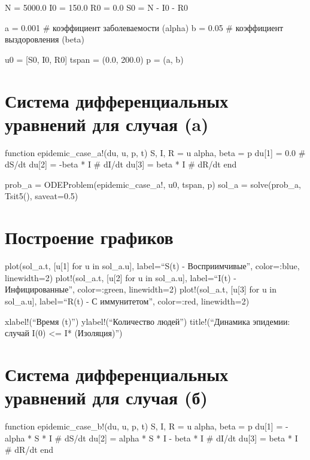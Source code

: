 \documentclass[
  english,
  russian,
  12pt,
  a4paper,
  DIV=11,
  numbers=noendperiod]{scrreprt}
\begin{document}
N = 5000.0 I0 = 150.0 R0 = 0.0 S0 = N - I0 - R0

a = 0.001 \# коэффициент заболеваемости (alpha) b = 0.05 \# коэффициент
выздоровления (beta)

u0 = {[}S0, I0, R0{]} tspan = (0.0, 200.0) p = (a, b)

\chapter{Система дифференциальных уравнений для случая
(a)}\label{ux441ux438ux441ux442ux435ux43cux430-ux434ux438ux444ux444ux435ux440ux435ux43dux446ux438ux430ux43bux44cux43dux44bux445-ux443ux440ux430ux432ux43dux435ux43dux438ux439-ux434ux43bux44f-ux441ux43bux443ux447ux430ux44f-a}

function epidemic\_case\_a!(du, u, p, t) S, I, R = u alpha, beta = p
du{[}1{]} = 0.0 \# dS/dt du{[}2{]} = -beta * I \# dI/dt du{[}3{]} = beta
* I \# dR/dt end

prob\_a = ODEProblem(epidemic\_case\_a!, u0, tspan, p) sol\_a =
solve(prob\_a, Tsit5(), saveat=0.5)

\chapter{Построение
графиков}\label{ux43fux43eux441ux442ux440ux43eux435ux43dux438ux435-ux433ux440ux430ux444ux438ux43aux43eux432}

plot(sol\_a.t, {[}u{[}1{]} for u in sol\_a.u{]}, label=\enquote{S(t) -
Восприимчивые}, color=:blue, linewidth=2) plot!(sol\_a.t, {[}u{[}2{]}
for u in sol\_a.u{]}, label=\enquote{I(t) - Инфицированные},
color=:green, linewidth=2) plot!(sol\_a.t, {[}u{[}3{]} for u in
sol\_a.u{]}, label=\enquote{R(t) - С иммунитетом}, color=:red,
linewidth=2)

xlabel!(\enquote{Время (t)}) ylabel!(\enquote{Количество людей})
title!(\enquote{Динамика эпидемии: случай I(0) \textless= I*
(Изоляция)})

\chapter{Система дифференциальных уравнений для случая
(б)}\label{ux441ux438ux441ux442ux435ux43cux430-ux434ux438ux444ux444ux435ux440ux435ux43dux446ux438ux430ux43bux44cux43dux44bux445-ux443ux440ux430ux432ux43dux435ux43dux438ux439-ux434ux43bux44f-ux441ux43bux443ux447ux430ux44f-ux431}

function epidemic\_case\_b!(du, u, p, t) S, I, R = u alpha, beta = p
du{[}1{]} = -alpha * S * I \# dS/dt du{[}2{]} = alpha * S * I - beta * I
\# dI/dt du{[}3{]} = beta * I \# dR/dt end
\end{document}
